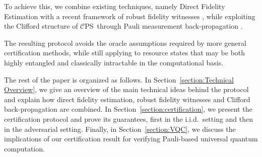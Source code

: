 \documentclass[a4paper,twocolumn,11pt,unpublished]{../../revision/quantumarticle}
\newcommand{\CEPS}{$\mathcal C$PS}
\providecommand{\DIFadd}[1]{{\protect\color{blue} \sf #1}} %
\providecommand{\DIFaddbegin}{} %
\providecommand{\DIFaddend}{} %
\begin{document}
To achieve this, we combine \DIFaddbegin \DIFadd{existing techniques, namely }\DIFaddend Direct Fidelity Estimation \cite{FL11direct, FOS24optimal} with a recent framework of robust fidelity witnesses \cite{CGKM21efficient}, while exploiting the Clifford structure of \CEPS~through Pauli measurement back-propagation \cite{UC24efficient}. 

The resulting protocol avoids the oracle assumptions required by more general certification methods, while still applying to resource states that may be both highly entangled and classically intractable in the computational basis.

The rest of the paper is organized as follows. In Section~\ref{section:Technical Overview}, we give an overview of the main technical ideas behind the protocol and explain how direct fidelity estimation, robust fidelity witnesses and Clifford back-propagation are combined. In Section~\ref{section:certification}, we present the certification protocol and prove its guarantees, first in the i.i.d.\ setting and then in the adversarial setting. Finally, in Section~\ref{section:VQC}, we discuss the implications of our certification result for verifying Pauli-based universal quantum computation.
\end{document}
